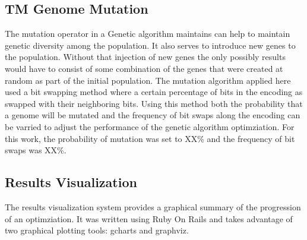 \subsection{TM Genome Mutation}
The mutation operator in a Genetic algorithm maintains can help to maintain genetic diversity among the population. It also serves to introduce new genes to the population. Without that injection of new genes the only possibly results would have to consist of some combination of the genes that were created at random as part of the initial population. The mutation algorithm applied here used a bit swapping method where a certain percentage of bits in the encoding as swapped with their neighboring bits. Using this method both the probability that a genome will be mutated and the frequency of bit swaps along the encoding can be varried to adjust the performance of the genetic algorithm optimziation. For this work, the probability of mutation was set to XX\% and the frequency of bit swaps was XX\%.

\subsection{Results Visualization}

The results visualization system provides a graphical summary of the progression of an optimziation. It was written using Ruby On Rails and takes advantage of two graphical plotting tools: gcharts and graphviz.
